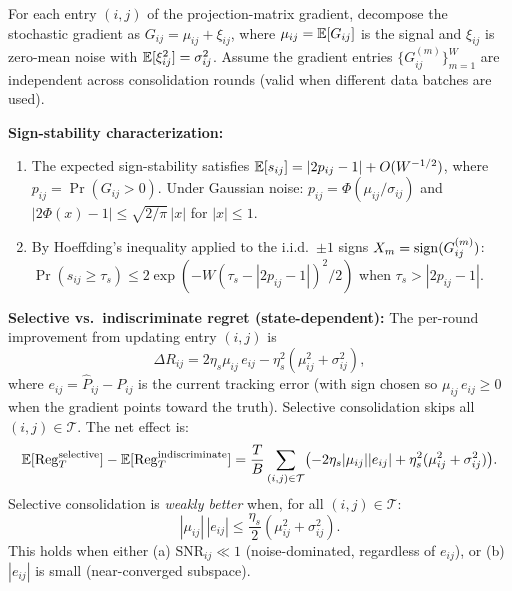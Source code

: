 \begin{proposition}
\label{prop:selective}
For each entry $(i,j)$ of the projection-matrix gradient, decompose the
stochastic gradient as $G_{ij} = \mu_{ij} + \xi_{ij}$, where
$\mu_{ij} = \mathbb{E}[G_{ij}]$ is the signal and $\xi_{ij}$ is zero-mean
noise with $\mathbb{E}[\xi_{ij}^2] = \sigma_{ij}^2$. Assume the gradient
entries $\{G_{ij}^{(m)}\}_{m=1}^W$ are independent across
consolidation rounds (valid when different data batches are used).

\textbf{Sign-stability characterization:}
\begin{enumerate}[nosep]
  \item The expected sign-stability satisfies
        $\mathbb{E}[s_{ij}] = |2p_{ij} - 1| + O(W^{-1/2})$,
        where $p_{ij} = \Pr(G_{ij} > 0)$. Under Gaussian noise:
        $p_{ij} = \Phi(\mu_{ij}/\sigma_{ij})$ and
        $|2\Phi(x)-1| \leq \sqrt{2/\pi}\,|x|$ for $|x| \leq 1$.
  \item By Hoeffding's inequality applied to the i.i.d.\ $\pm 1$ signs
        $X_m = \mathrm{sign}(G_{ij}^{(m)})$:
        $\Pr(s_{ij} \geq \tau_s) \leq 2\exp(-W(\tau_s - |2p_{ij}-1|)^2/2)$
        when $\tau_s > |2p_{ij}-1|$.
\end{enumerate}

\textbf{Selective vs.\ indiscriminate regret (state-dependent):}
The per-round improvement from updating entry $(i,j)$ is
\[
  \Delta R_{ij} = 2\eta_s \mu_{ij}\, e_{ij}
  - \eta_s^2(\mu_{ij}^2 + \sigma_{ij}^2),
\]
where $e_{ij} = \hat{P}_{ij} - P_{ij}$ is the current tracking error
(with sign chosen so $\mu_{ij}\, e_{ij} \geq 0$ when the gradient
points toward the truth). Selective consolidation skips
all $(i,j) \in \mathcal{T}$. The net effect is:
\[
  \mathbb{E}[\mathrm{Reg}_T^{\mathrm{selective}}] -
  \mathbb{E}[\mathrm{Reg}_T^{\mathrm{indiscriminate}}]
  = \frac{T}{B}\sum_{(i,j) \in \mathcal{T}}
    \bigl(-2\eta_s |\mu_{ij}| |e_{ij}|
    + \eta_s^2(\mu_{ij}^2 + \sigma_{ij}^2)\bigr).
\]
Selective consolidation is \emph{weakly better} when, for all
$(i,j) \in \mathcal{T}$:
\[
  |\mu_{ij}|\, |e_{ij}| \leq \frac{\eta_s}{2}(\mu_{ij}^2 + \sigma_{ij}^2).
\]
This holds when either (a) $\mathrm{SNR}_{ij} \ll 1$ (noise-dominated,
regardless of $e_{ij}$), or (b) $|e_{ij}|$ is small
(near-converged subspace).
\end{proposition}

